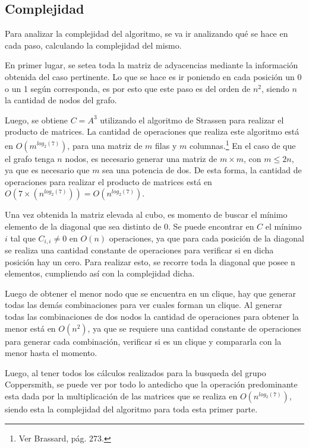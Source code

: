 \documentclass[a4paper, 12pt]{article}
\begin{document}
\subsection*{Complejidad}

Para analizar la complejidad del algoritmo, se va ir analizando qué se hace en cada paso, calculando la complejidad del mismo.

En primer lugar, se setea toda la matriz de adyacencias mediante la información obtenida del caso pertinente. Lo que se hace es ir poniendo en cada posición un 0 o un 1 según corresponda, es por esto que este paso es del orden de $n^2$, siendo $n$ la cantidad de nodos del grafo.

Luego, se obtiene $C = A^3$ utilizando el algoritmo de Strassen para realizar el producto de matrices. La cantidad de operaciones que realiza este algoritmo está en $O\left(m^{log_2\left(7\right)}\right)$, para una matriz de $m$ filas y $m$ columnas.\footnote{Ver Brassard, pág. 273.} En el caso de que el grafo tenga $n$ nodos, es necesario generar una matriz de $m \times m$, con $m \leq 2n$, ya que es necesario que $m$ sea una potencia de dos. De esta forma, la cantidad de operaciones para realizar el producto de matrices está en $O\left(7 \times \left(n ^{log_2 \left( 7\right)} \right) \right) = O\left(n^{log_2\left(7\right)}\right)$.



Una vez obtenida la matriz elevada al cubo, es momento de buscar el mínimo elemento de la diagonal que sea distinto de 0. Se puede encontrar en $C$ el mínimo $i$ tal que $C_{i,i} \neq 0$ en $O\left(n\right)$ operaciones, ya que para cada posición de la diagonal se realiza una cantidad constante de operaciones para verificar si en dicha posición hay un cero. Para realizar esto, se recorre toda la diagonal que posee n elementos, cumpliendo así con la complejidad dicha.

Luego de obtener el menor nodo que se encuentra en un clique, hay que generar todas las demás combinaciones para ver cuales forman un clique. 
Al generar todas las combinaciones de dos nodos la cantidad de operaciones para obtener la menor está en $O\left(n^2\right)$, ya que se requiere una cantidad constante de operaciones para generar cada combinación, verificar si es un clique y compararla con la menor hasta el momento.

Luego, al tener todos los cálculos realizados para la busqueda del grupo Coppersmith, se puede ver por todo lo antedicho que la operación predominante esta dada por la multiplicación de las matrices que se realiza en $O\left(n^{log_2\left(7\right)}\right)$, siendo esta la complejidad del algoritmo para toda esta primer parte.
\end{document}

